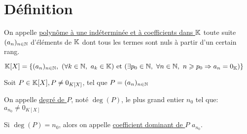 \documentclass[12pt,twoside,a4paper]{article}
\author{MPSI 2}
\begin{document}
	\maketitle
	\section{Définition}
		\begin{defi}
			On appelle \underline{polyn\^ome \`a une indéterminée et \`a coefficients dans $\mathbb{K}$} toute suite $(a_n)_{n\in\mathbb{N}}$ d'éléments de $\mathbb{K}$ dont tous les termes sont nuls \`a partir d'un certain rang.
		\end{defi}
		\begin{flushleft}
			$\K[X]=\{(a_n)_{n\in\N},\ (\forall k\in\N,\ a_k\in\K)\et (\exists p_0\in\N,\ \forall n\in\N,\ n\geqslant p_0\Rightarrow a_n=0_\K) \}$
		\end{flushleft}
		\begin{defi}
			Soit $P\in \mathbb{K}[X], P\neq 0_{K[X]}$, tel que $P=(a_n)_{n\in\mathbb{N}}$
			\begin{liste}
				\item On appelle \underline{degré de $P$}, noté $\deg(P)$, le plus grand entier $n_0$ tel que: $a_{n_0}\neq 0_{K[X]}$
				\item Si $\deg(P)=n_0$, alors on appelle \underline{coefficient dominant de $P$} $a_{n_0}$.
				\item 
			\end{liste}
		\end{defi}
\end{document}
